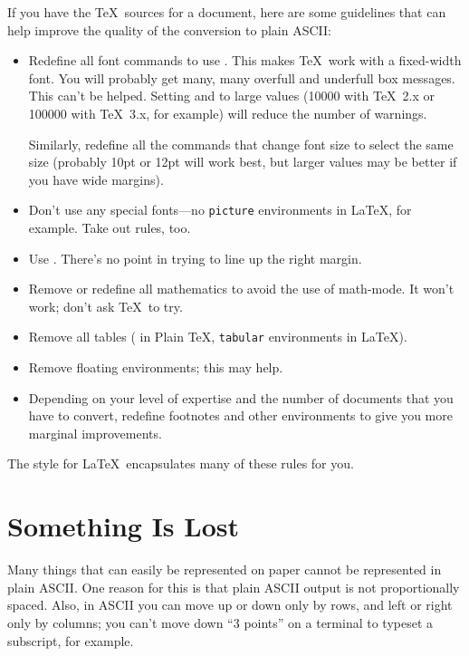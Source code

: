 If you have the \TeX\ sources for a document, 
here are some guidelines that can help improve the quality of
the conversion to plain ASCII: 

\begin{itemize}
  \item Redefine all font commands to use .  This makes \TeX\
        work with a fixed-width font.  You will probably get many, many
        overfull and underfull box messages.  This can't be helped.  Setting
        \cs{tolerance} and \cs{hbadness} to large values
        (10000 with \TeX\ 2.x or 100000 with \TeX\ 3.x, for example) will
        reduce the number of warnings.

        Similarly, redefine all the commands that change font size to select
        the same size (probably 10pt or 12pt will work best, but larger
        values may be better if you have wide margins).

  \item Don't use any special fonts---no \verb|picture| environments in \LaTeX,
        for example.  Take out rules, too.

  \item Use .  There's no point in trying to line
        up the right margin.

  \item Remove or redefine all mathematics to avoid the use of math-mode.
        It won't work; don't ask \TeX\ to try.

  \item Remove all tables ( in Plain \TeX, \verb|tabular|
        environments in \LaTeX).
 
  \item Remove floating environments; this may help.

  \item Depending on your level of expertise and the number of documents
        that you have to convert, redefine footnotes and other environments
        to give you more marginal improvements.
\end{itemize}

The  style for 
\LaTeX\ encapsulates many of these rules for you.

\section{Something Is Lost}

Many things that can easily be represented
on paper cannot be represented in plain ASCII.  One reason for this
is that plain ASCII output is not proportionally spaced.  Also, in ASCII
you can move up or down only by
rows, and left or right only by columns; you can't move down ``3 points'' 
on a terminal to typeset a subscript, for example.

